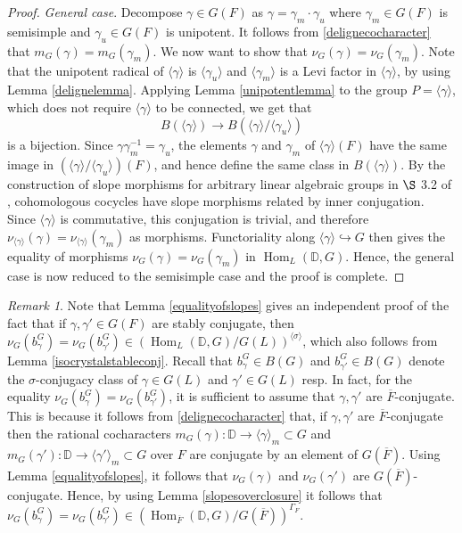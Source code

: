 \documentclass[11pt,a4paper]{article}
\theoremstyle{definition}
\theoremstyle{plain}
\theoremstyle{remark}
\newtheorem{R}[shared]{Remark}
\theoremstyle{plain}
\DeclareMathOperator{\Hom}{Hom}
\begin{document}
\begin{proof}
    \textit{General case}. Decompose $\gamma \in G(F)$ as $\gamma = \gamma_m \cdot \gamma_u$ where $\gamma_m \in G(F)$ is semisimple and $\gamma_u \in G(F)$ is unipotent. It follows from \ref{delignecocharacter} that $m_G(\gamma) = m_G(\gamma_m)$. We now want to show that $\nu_G(\gamma) = \nu_G(\gamma_m)$. Note that the unipotent radical of $\langle \gamma \rangle$ is $\langle \gamma_u \rangle$ and $\langle \gamma_m \rangle$ is a Levi factor in $\langle \gamma \rangle$, by using Lemma \ref{delignelemma}. Applying Lemma \ref{unipotentlemma} to the group $P = \langle \gamma \rangle$, which does not require $\langle \gamma \rangle$ to be connected, we get that $$ B(\langle \gamma \rangle) \xrightarrow[]{} B(\langle \gamma \rangle/\langle \gamma_u \rangle)$$ is a bijection. Since $\gamma \gamma_m^{-1} = \gamma_u$, the elements $\gamma$ and $\gamma_m$ of $\langle \gamma \rangle(F)$ have the same image in $(\langle \gamma \rangle/\langle \gamma_u \rangle)(F)$, and hence define the same class in $B(\langle \gamma \rangle)$. By the construction of slope morphisms for arbitrary linear algebraic groups in $\S$ 3.2 of \cite{MR1485921}, cohomologous cocycles have slope morphisms related by inner conjugation. Since $\langle \gamma \rangle$ is commutative, this conjugation is trivial, and therefore $\nu_{\langle \gamma \rangle}(\gamma) = \nu_{\langle \gamma \rangle}(\gamma_m)$ as morphisms. Functoriality along $\langle \gamma \rangle \hookrightarrow G$ then gives the equality of morphisms $\nu_G(\gamma) = \nu_G(\gamma_m)$ in $\Hom_L(\mathbb{D}, G)$. Hence, the general case is now reduced to the semisimple case and the proof is complete.
\end{proof}

\begin{R}
    Note that Lemma \ref{equalityofslopes} gives an independent proof of the fact that if $\gamma, \gamma' \in G(F)$ are stably conjugate, then $\nu_G(b^G_\gamma) = \nu_G(b^G_{\gamma'}) \in (\Hom_L(\mathbb{D},G)/G(L))^{\langle \sigma \rangle}$, which also follows from Lemma \ref{isocrystalstableconj}. Recall that $b_{\gamma}^G \in B(G)$ and $b_{\gamma'}^G \in B(G)$ denote the $\sigma$-conjugacy class of $\gamma \in G(L)$ and $\gamma' \in G(L)$ resp. In fact, for the equality $\nu_G(b^G_\gamma) = \nu_G(b_{\gamma'}^G)$, it is sufficient to assume that $\gamma, \gamma'$ are $\overline{F}$-conjugate. This is because it follows from \ref{delignecocharacter} that, if $\gamma, \gamma'$ are $\overline{F}$-conjugate then the rational cocharacters $m_G(\gamma): \mathbb{D} \xrightarrow[]{} \langle \gamma \rangle_m \subset G$ and $m_G(\gamma'): \mathbb{D} \xrightarrow[]{} \langle \gamma' \rangle_m \subset G$ over $F$ are conjugate by an element of $G(\overline{F})$. Using Lemma \ref{equalityofslopes}, it follows that $\nu_G(\gamma)$ and $\nu_G(\gamma')$ are $G(\overline{F})$-conjugate. Hence, by using Lemma \ref{slopesoverclosure} it follows that $\nu_G(b^G_\gamma) = \nu_G(b_{\gamma'}^G) \in (\Hom_{\overline{F}}(\mathbb{D},G)/G(\overline{F}))^{\Gamma_F}$. 
\end{R}
\end{document}
